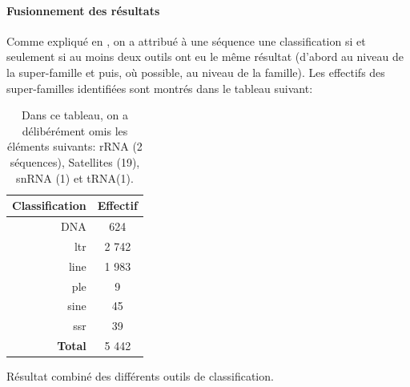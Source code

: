 \documentclass[10pt]{article}
\begin{document}
\bigskip

\paragraph{Fusionnement des résultats} Comme expliqué en \sectionautorefname{ \ref{sec:classif_sec}}, on a attribué à une séquence une classification si et seulement si au moins deux outils ont eu le même résultat (d'abord au niveau de la super-famille et puis, où possible, au niveau de la famille). Les effectifs des super-familles identifiées sont montrés dans le tableau suivant: \\

\bigskip

\begin{table}[H]
    \centering
    \begin{tabular}{r|c}
        \toprule
        \textbf{Classification} & \textbf{Effectif} \\
        \midrule
        DNA & 624  \\
        \rowcolor{gray!10}
        \acrshort{ltr} & 2 742 \\
        \acrshort{line} & 1 983 \\
        \rowcolor{gray!10}
        \acrshort{ple} & 9 \\
        \acrshort{sine} & 45 \\
        \rowcolor{gray!10}
        \acrshort{ssr} & 39 \\
        \midrule
        \rowcolor{gray!10}
        \textbf{Total} & 5 442 \\
        \bottomrule
    \end{tabular}
    \caption{Résultat combiné des différents outils de classification.}
    \caption*{
    \scriptsize{
    Dans ce tableau, on a délibérément omis les éléments suivants: rRNA (2 séquences), Satellites (19), snRNA (1) et tRNA(1).
    }
    }
    \label{tab:merged_classif}
\end{table}

\bigskip
\end{document}
